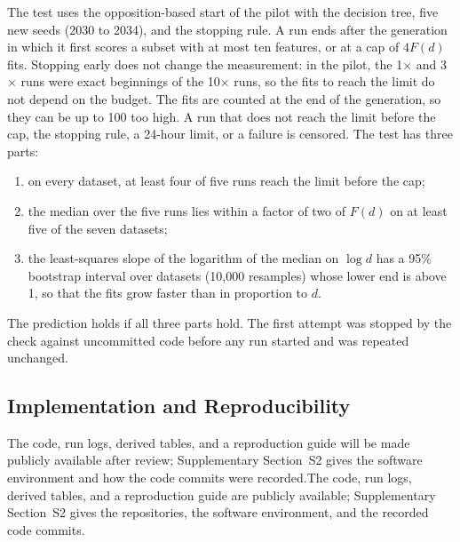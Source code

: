 The test uses the opposition-based start of the pilot with the decision tree, five new seeds (2030 to 2034), and the stopping rule. A run ends after the generation in which it first scores a subset with at most ten features, or at a cap of $4F(d)$ fits. Stopping early does not change the measurement: in the pilot, the 1$\times$ and 3$\times$ runs were exact beginnings of the 10$\times$ runs, so the fits to reach the limit do not depend on the budget. The fits are counted at the end of the generation, so they can be up to 100 too high. A run that does not reach the limit before the cap, the stopping rule, a 24-hour limit, or a failure is censored. The test has three parts:
\begin{enumerate}
  \item on every dataset, at least four of five runs reach the limit before the cap;
  \item the median over the five runs lies within a factor of two of $F(d)$ on at least five of the seven datasets;
  \item the least-squares slope of the logarithm of the median on $\log d$ has a 95\% bootstrap interval over datasets (10{,}000 resamples) whose lower end is above 1, so that the fits grow faster than in proportion to $d$.
\end{enumerate}
The prediction holds if all three parts hold. The first attempt was stopped by the check against uncommitted code before any run started and was repeated unchanged.



\subsection{Implementation and Reproducibility}
\label{sec:repro}

\ifanonymous The code, run logs, derived tables, and a reproduction guide will be made publicly available after review; Supplementary Section~S2 gives the software environment and how the code commits were recorded.\else The code, run logs, derived tables, and a reproduction guide are publicly available; Supplementary Section~S2 gives the repositories, the software environment, and the recorded code commits.\fi
